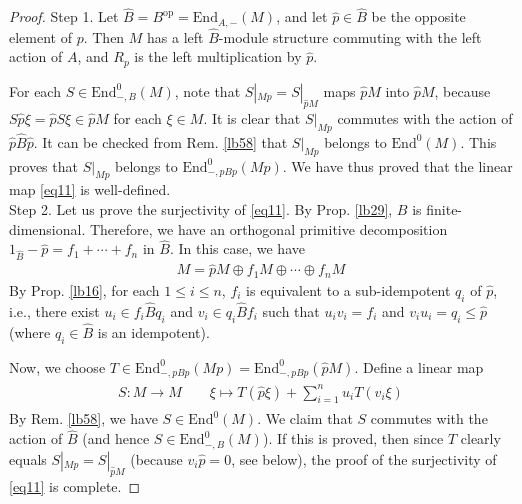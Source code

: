 \documentclass[11pt,b5paper,notitlepage]{article}
\theoremstyle{definition}
\theoremstyle{plain}
\newcommand{\wht}{\widehat}
\newcommand{\End}{\mathrm{End}} %
\newcommand{\opp}{\mathrm{op}}
\numberwithin{equation}{section}
\begin{document}
\begin{proof}
Step 1. Let $\wht B=B^\opp=\End_{A,-}(M)$, and let $\wht p\in\wht B$ be the opposite element of $p$. Then $M$ has a left $\wht B$-module structure commuting with the left action of $A$, and $R_p$ is the left multiplication by $\wht p$.

For each $S\in\End^0_{-,B}(M)$, note that $S|_{Mp}=S|_{\wht pM}$ maps $\wht pM$ into $\wht pM$, because $S\wht p\xi=\wht pS\xi\in\wht pM$ for each $\xi\in M$. It is clear that $S|_{Mp}$ commutes with the action of $\wht p\wht B\wht p$. It can be checked from Rem. \ref{lb58} that $S|_{Mp}$ belongs to $\End^0(M)$. This proves that $S|_{Mp}$ belongs to $\End^0_{-,pBp}(Mp)$. We have thus proved that the linear map \eqref{eq11} is well-defined.\\[-1ex]

Step 2. Let us prove the surjectivity of \eqref{eq11}. By Prop. \ref{lb29}, $B$ is finite-dimensional. Therefore, we have an orthogonal primitive decomposition $1_{\wht B}-\wht p=f_1+\cdots +f_n$ in $\wht B$. In this case, we have 
\begin{align*}
M=\wht pM\oplus f_1 M \oplus \cdots \oplus f_n M
\end{align*}
By Prop. \ref{lb16}, for each $1\leq i\leq n$, $f_i$ is equivalent to a sub-idempotent $q_i$ of $\wht p$, i.e., there exist $u_i\in f_i\wht B q_i$ and $v_i\in q_i\wht B f_i$ such that $u_iv_i=f_i$ and $v_iu_i=q_i\leq \wht p$ (where $q_i\in\wht B$ is an idempotent). 



Now, we choose $T\in\End_{-,pBp}^0(Mp)=\End_{-,pBp}^0(\wht pM)$. Define a linear map 
	\begin{gather}\label{eq12}
	\begin{gathered}
		S:M\rightarrow M\qquad
		\xi\mapsto T(\wht p\xi)+\sum_{i=1}^n u_i T(v_i\xi)
	\end{gathered}
\end{gather}
By Rem. \ref{lb58}, we have $S\in\End^0(M)$. We claim that $S$ commutes with the action of $\wht B$ (and hence $S\in \End_{-,B}^0(M)$). If this is proved, then since $T$ clearly equals $S|_{Mp}=S|_{\wht pM}$ (because $v_i\wht p=0$, see below), the proof of the surjectivity of \eqref{eq11} is complete.


\end{proof}
\end{document}
